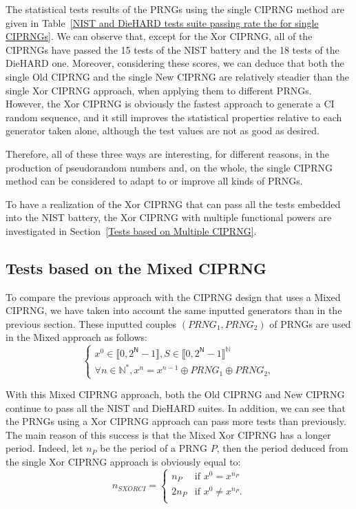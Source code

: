 \documentclass[10pt, conference, compsocconf]{IEEEtran}
\begin{document}
The statistical tests results of the PRNGs using the single CIPRNG method are given in Table~\ref{NIST and DieHARD tests suite passing rate the for single CIPRNGs}.
We can observe that, except for the Xor CIPRNG, all of the CIPRNGs have passed the 15 tests of the NIST battery and the 18 tests of the DieHARD one.
Moreover, considering these scores, we can deduce that both the single Old CIPRNG and the single New CIPRNG are relatively steadier than the single Xor CIPRNG approach, when applying them to different PRNGs.
However, the Xor CIPRNG is obviously the fastest approach to generate a CI random sequence, and it still improves the statistical properties relative to each generator taken alone, although the test values are not as good as desired.

Therefore, all of these three ways are interesting, for different reasons, in the production of pseudorandom numbers and,
on the whole, the single CIPRNG method can be considered to adapt to or improve all kinds of PRNGs.

To have a realization of the Xor CIPRNG that can pass all the tests embedded into the NIST battery, the Xor CIPRNG with multiple functional powers are investigated in Section~\ref{Tests based on Multiple CIPRNG}.



\subsection{Tests based on the Mixed CIPRNG}

To compare the previous approach with the CIPRNG design that uses a Mixed CIPRNG, we have taken into account the same inputted generators than in the previous section.
These inputted couples $(PRNG_1,PRNG_2)$ of PRNGs are used in the Mixed approach as follows:
\begin{equation}
\left\{
\begin{array}{l}
x^0 \in \llbracket 0, 2^\mathsf{N}-1 \rrbracket, S \in \llbracket 0, 2^\mathsf{N}-1 \rrbracket^\mathds{N} \\
\forall n \in \mathds{N}^*, x^n = x^{n-1} \oplus PRNG_1\oplus PRNG_2,
\end{array}
\right.
\label{equation Oplus}
\end{equation}

With this Mixed CIPRNG approach, both the Old CIPRNG and New CIPRNG continue to pass all the NIST and DieHARD suites.
In addition, we can see that the PRNGs using a Xor CIPRNG approach can pass more tests than previously.
The main reason of this success is that the Mixed Xor CIPRNG has a longer period.
Indeed, let $n_{P}$ be the period of a PRNG $P$, then the period deduced from the single Xor CIPRNG approach is obviously equal to:
\begin{equation}
n_{SXORCI}=
\left\{
\begin{array}{ll}
n_{P}&\text{if~}x^0=x^{n_{P}}\\
2n_{P}&\text{if~}x^0\neq x^{n_{P}}.\\
\end{array}
\right.
\label{equation Oplus}
\end{equation}
\end{document}
